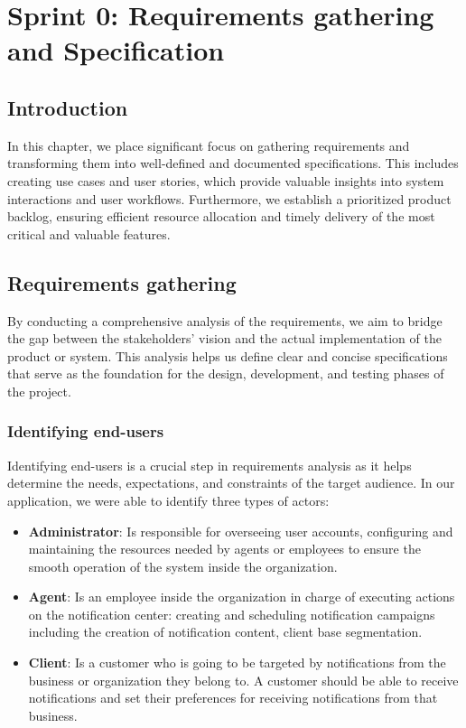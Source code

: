 \chapter{Sprint 0: Requirements gathering and Specification}

\section*{Introduction}
In this chapter, we place significant focus on gathering requirements and transforming them
into well-defined and documented specifications. This includes creating use cases and user stories,
which provide valuable insights into system interactions and user workflows. Furthermore, we establish
a prioritized product backlog, ensuring efficient resource allocation and timely delivery of the most
critical and valuable features.

\section{Requirements gathering}
By conducting a comprehensive analysis of the requirements, we aim to bridge the gap between
the stakeholders' vision and the actual implementation of the product or system.
This analysis helps us define clear and concise specifications that serve as the foundation for the design,
development, and testing phases of the project.

\subsection{Identifying end-users}
Identifying end-users is a crucial step in requirements analysis as it helps determine the needs,
expectations, and constraints of the target audience. In our application, we were able to identify
three types of actors:

\begin{itemize}
      \item \textbf{Administrator}: Is responsible for overseeing user accounts, configuring and maintaining the
            resources needed by agents or employees to ensure the smooth operation of the system inside the organization.

      \item \textbf{Agent}: Is an employee inside the organization in charge of executing actions on the
            notification center: creating and scheduling notification campaigns including the creation of
            notification content, client base segmentation.

      \item \textbf{Client}: Is a customer who is going to be targeted by notifications from the business
            or organization they belong to. A customer should be able to receive notifications and set their
            preferences for receiving notifications from that business.
\end{itemize}

